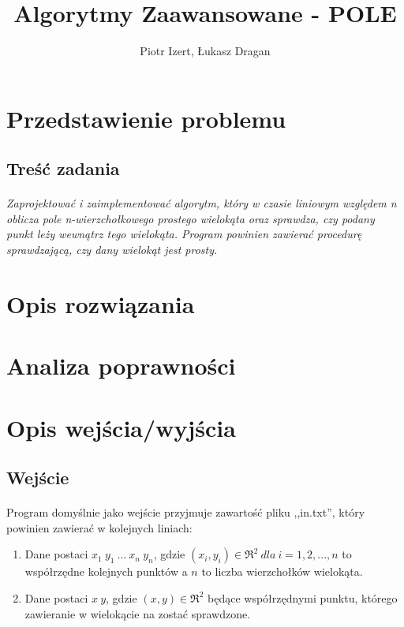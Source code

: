 \documentclass{article}
\author{Piotr Izert, Łukasz Dragan}
\title{Algorytmy Zaawansowane - POLE}
\begin{document}
\maketitle
\newpage
\tableofcontents
\newpage
\section{Przedstawienie problemu}

\subsection{Treść zadania}
\paragraph{}
\textit{
Zaprojektować i zaimplementować algorytm, który w czasie liniowym względem n oblicza pole n-wierzchołkowego prostego wielokąta oraz sprawdza, czy podany punkt leży wewnątrz tego wielokąta. Program powinien zawierać procedurę sprawdzającą, czy dany wielokąt jest prosty.
}
\subsection{}

\section{Opis rozwiązania}
\section{Analiza poprawności}
\section{Opis wejścia/wyjścia}
\subsection{Wejście}
\paragraph{}Program domyślnie jako wejście przyjmuje zawartość pliku ,,in.txt'', który powinien zawierać w kolejnych liniach:
\begin{enumerate}
\item Dane postaci \(x_1\ y_1\ ...\ x_n\ y_n\), gdzie \((x_i,y_i) \in \Re^{2} \ dla\ i=1,2,...,n\) to współrzędne kolejnych punktów a \(n\) to liczba wierzchołków wielokąta.
\item Dane postaci \(x\ y\), gdzie \((x,y) \in \Re^{2}\) będące współrzędnymi punktu, którego zawieranie w wielokącie na zostać sprawdzone.
\end{enumerate}
\end{document}
